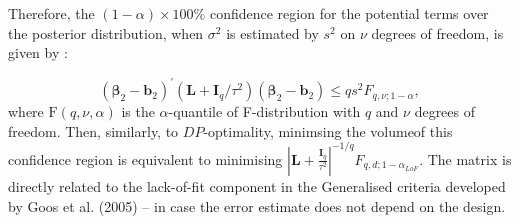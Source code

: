 Therefore, the $(1-\alpha)\times100\%$ confidence region for the potential terms over the posterior distribution, when $\sigma^2$ is estimated by $s^2$ on $\nu$ degrees of freedom, is given by \citep{Draper1998}:

$$(\bm{\beta}_{2}-\bm{b}_{2})^{'}(\bm{L}+\bm{I}_{q}/\tau^{2})(\bm{\beta}_{2}-\bm{b}_{2})\leq qs^{2}F_{q,\nu;1-\alpha},$$
where $\mathrm{F}(q,\nu,\alpha)$ is the $\alpha$-quantile of F-distribution with $q$ and $\nu$ degrees of freedom. Then, similarly, to $DP$-optimality, minimsing the volumeof this confidence region is equivalent to minimising $\left|\bm{L}+\frac{\bm{I}_{q}}{\tau^{2}}\right|^{-1/q}F_{q,d;1-\alpha_{LoF}}$. The matrix is directly related to the lack-of-fit component in the Generalised criteria developed by Goos et al. (2005) -- in case the error estimate does not depend on the design.

